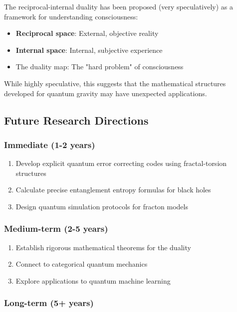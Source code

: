 The reciprocal-internal duality has been proposed (very speculatively) as a framework for understanding consciousness:
\begin{itemize}
    \item \textbf{Reciprocal space}: External, objective reality
    \item \textbf{Internal space}: Internal, subjective experience
    \item The duality map: The "hard problem" of consciousness
\end{itemize}

While highly speculative, this suggests that the mathematical structures developed for quantum gravity may have unexpected applications.

\subsection{Future Research Directions}

\subsubsection{Immediate (1-2 years)}

\begin{enumerate}
    \item Develop explicit quantum error correcting codes using fractal-torsion structures
    \item Calculate precise entanglement entropy formulas for black holes
    \item Design quantum simulation protocols for fracton models
\end{enumerate}

\subsubsection{Medium-term (2-5 years)}

\begin{enumerate}
    \item Establish rigorous mathematical theorems for the duality
    \item Connect to categorical quantum mechanics
    \item Explore applications to quantum machine learning
\end{enumerate}

\subsubsection{Long-term (5+ years)}

